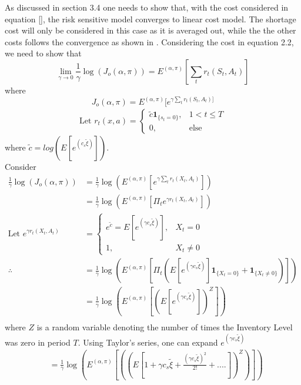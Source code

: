 \begin{appendix}
As discussed in section 3.4 one needs to show that, with the cost considered in equation [], the risk sensitive model converges to linear cost model. The shortage cost will only be considered in this case as it is averaged out, while the the other costs follows the convergence as shown in \cite{kumar2015finite}. Considering the cost in equation 2.2, we need to show that
\begin{equation}
\lim_{\gamma\rightarrow0}\frac{1}{\gamma}\log(J_o(\alpha,\pi)) = E^{(\alpha,\pi)}[ \sum_t r_t(S_t,A_t)]
\end{equation}
where
\begin{equation*}
J_o(\alpha,\pi) = E^{(\alpha,\pi)}[e^{\gamma \sum_t r_t(S_t,A_t)]} 
\end{equation*}
\begin{align}
\text{Let } r_t(x,a) = 
\begin{cases}
\tilde{c}\mathbf{1}_{\lbrace s_t=0\rbrace},&1<t\leq T\\
0,&\text{else}
\end{cases}
\end{align}
where $\tilde{c} = log(E[e^{(c_s \tilde{\xi})}]). $\\
Consider
\begin{align}
\frac{1}{\gamma}\log(J_o(\alpha,\pi))&= \frac{1}{\gamma}\log(E^{(\alpha,\pi)}[e^{\gamma \sum_t r_t(X_t,A_t)}])\\ \nonumber
&=\frac{1}{\gamma}\log(E^{(\alpha,\pi)}[\Pi_t e^{\gamma r_t(X_t,A_t)}])\\ 
\text{Let }e^{\gamma r_t(X_t,A_t)}&=
\begin{cases}
e^{\tilde{c}} = E[e^{(\gamma c_s \tilde{\xi})}],& X_t=0\\
1,& X_t\neq0
\end{cases}\\ \nonumber
\therefore &=\frac{1}{\gamma}\log(E^{(\alpha,\pi)}[\Pi_t(E[e^{(\gamma c_s \tilde{\xi})}]\mathbf{1}_{\lbrace X_t=0\rbrace} + \mathbf{1}_{\lbrace X_t\neq 0\rbrace})])\\ \nonumber
&=\frac{1}{\gamma}\log(E^{(\alpha,\pi)}[(E[e^{(\gamma c_s \tilde{\xi})}])^Z])\\ \nonumber
\end{align}
where $Z$ is a random variable denoting the number of times the Inventory Level was zero in period $T$.
Using Taylor's series, one can expand $e^{(\gamma c_s \tilde{\xi})}$
\begin{align}
&=\frac{1}{\gamma}\log(E^{(\alpha,\pi)}[((E[1 + \gamma c_s \tilde{\xi} + \frac{(\gamma c_s \tilde{\xi})^2}{2!} + ....])^Z)])

\end{align}
\end{appendix}
